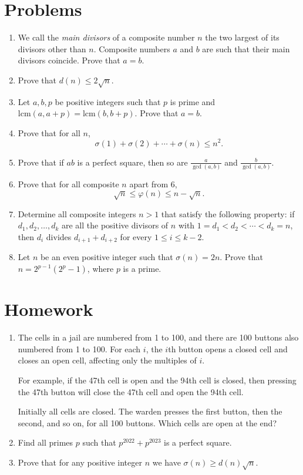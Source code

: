 \documentclass{article}
\newcommand\lcm{\text{lcm}}
\begin{document}
\section{Problems}
\begin{enumerate}
	\item We call the \emph{main divisors} of a composite number $n$ the two
	      largest of its divisors other than $n$. Composite numbers $a$ and $b$ are
	      such that their main divisors coincide. Prove that $a=b$.
	\item Prove that $d(n)\le 2\sqrt n$.
	\item Let $a,b,p$ be positive integers such that $p$ is prime and
	      $\lcm(a,a+p)=\lcm(b,b+p)$. Prove that $a=b$.
	\item Prove that for all $n$,
	      \[\sigma(1)+\sigma(2)+\cdots+\sigma(n)\le n^2.\]
	\item Prove that if $ab$ is a perfect square, then so are $\frac a{\gcd(a,b)}$ and
	      $\frac b{\gcd(a,b)}$.
	\item Prove that for all composite $n$ apart from 6,
	      \[\sqrt n\le\varphi(n)\le n-\sqrt n.\]
	\item Determine all composite integers $n>1$ that satisfy the following
	      property: if $d_1, d_2, \ldots, d_k$ are all the positive divisors of $n$
	      with $1=d_1<d_2<\cdots<d_k=n$, then $d_i$ divides $d_{i+1}+d_{i+2}$ for
	      every $1 \leq i \leq k-2$.
	\item Let $n$ be an even positive integer such that $\sigma(n)=2n$. Prove that
	      $n=2^{p-1}\left(2^p-1\right)$, where $p$ is a prime.
\end{enumerate}
\newpage
\section{Homework}
\begin{enumerate}
	\item The cells in a jail are numbered from 1 to 100, and there are 100
	      buttons also numbered from 1 to 100. For each $i$, the $i$th button opens a
	      closed cell and closes an open cell, affecting only the multiples of $i$.

	      For example, if the 47th cell is open and the 94th cell is closed, then
	      pressing the 47th button will close the 47th cell and open the 94th cell.

	      Initially all cells are closed.
	      The warden presses the first button, then the second, and so on, for all
	      100 buttons. Which cells are open at the end?
	\item Find all primes $p$ such that $p^{2022}+p^{2023}$ is a perfect square.
	\item Prove that for any positive integer $n$ we have $\sigma(n)\ge d(n)\sqrt
		      n$.
\end{enumerate}
\end{document}
